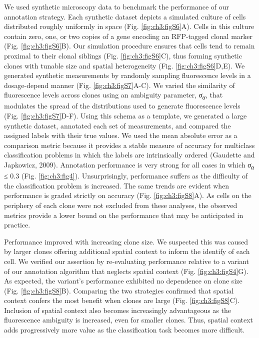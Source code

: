 We used synthetic microscopy data to benchmark the performance of our annotation strategy. Each synthetic dataset depicts a simulated culture of cells distributed roughly uniformly in space (Fig. \ref{fig:ch3:figS6}A). Cells in this culture contain zero, one, or two copies of a gene encoding an RFP-tagged clonal marker (Fig. \ref{fig:ch3:figS6}B). Our simulation procedure ensures that cells tend to remain proximal to their clonal siblings (Fig. \ref{fig:ch3:figS6}C), thus forming synthetic clones with tunable size and spatial heterogeneity (Fig. \ref{fig:ch3:figS6}D,E). We generated synthetic measurements by randomly sampling fluorescence levels in a dosage-depend manner (Fig. \ref{fig:ch3:figS7}A-C). We varied the similarity of fluorescence levels across clones using an ambiguity parameter, \emph{σ\textsubscript{α}}, that modulates the spread of the distributions used to generate fluorescence levels (Fig. \ref{fig:ch3:figS7}D-F). Using this schema as a template, we generated a large synthetic dataset, annotated each set of measurements, and compared the assigned labels with their true values. We used the mean absolute error as a comparison metric because it provides a stable measure of accuracy for multiclass classification problems in which the labels are intrinsically ordered (Gaudette and Japkowicz, 2009). Annotation performance is very strong for all cases in which \emph{σ\textsubscript{α}} ≤ 0.3 (Fig. \ref{fig:ch3:fig4}). Unsurprisingly, performance suffers as the difficulty of the classification problem is increased. The same trends are evident when performance is graded strictly on accuracy (Fig. \ref{fig:ch3:figS8}A). As cells on the periphery of each clone were not excluded from these analyses, the observed metrics provide a lower bound on the performance that may be anticipated in practice.

Performance improved with increasing clone size. We suspected this was caused by larger clones offering additional spatial context to inform the identify of each cell. We verified our assertion by re-evaluating performance relative to a variant of our annotation algorithm that neglects spatial context (Fig. \ref{fig:ch3:figS4}G). As expected, the variant's performance exhibited no dependence on clone size (Fig. \ref{fig:ch3:figS8}B). Comparing the two strategies confirmed that spatial context confers the most benefit when clones are large (Fig. \ref{fig:ch3:figS8}C). Inclusion of spatial context also becomes increasingly advantageous as the fluorescence ambiguity is increased, even for smaller clones. Thus, spatial context adds progressively more value as the classification task becomes more difficult.

